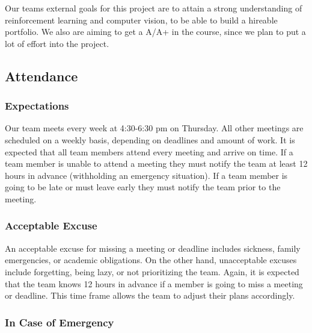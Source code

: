 \documentclass{article}
\begin{document}
\raggedright
Our teams external goals for this project are to attain a strong understanding
of reinforcement learning and computer vision, to be able to build a hireable portfolio. 
We also are aiming to get a A/A+ in the course, since we plan to put a lot of effort into the
project.

\subsection*{Attendance}

\subsubsection*{Expectations}


\raggedright
Our team meets every week at 4:30-6:30 pm on Thursday. All other meetings are 
scheduled on a weekly basis, depending on deadlines and amount of work. It is expected that all
team members attend every meeting and arrive on time. If a team member is unable
to attend a meeting they must notify the team at least 12 hours in advance (withholding an emergency situation). If a 
team member is going to be late or must leave early they must notify the team prior
to the meeting. 

\subsubsection*{Acceptable Excuse}


\raggedright
An acceptable excuse for missing a meeting or deadline includes sickness, family
emergencies, or academic obligations. On the other hand, unacceptable excuses include
forgetting, being lazy, or not prioritizing the team. Again, it is expected that the team
knows 12 hours in advance if a member is going to miss a meeting or deadline. This time
frame allows the team to adjust their plans accordingly.

\subsubsection*{In Case of Emergency}

\end{document}
